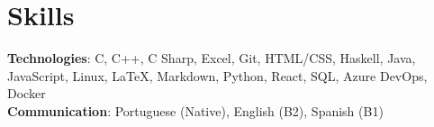 \documentclass[letterpaper,11pt]{article}
\begin{document}
%
\section{Skills}
 \begin{itemize}[leftmargin=0.15in, label={}]
    \small{\item{
     \textbf{Technologies}{: C, C++, C Sharp, Excel, Git, HTML/CSS, Haskell, Java, JavaScript, Linux, \LaTeX, Markdown, Python, React, SQL, Azure DevOps, Docker} \\
     \textbf{Communication}{: Portuguese (Native), English (B2), Spanish (B1)}
    }}
 \end{itemize}
 \vspace{-16pt}
\end{document}
